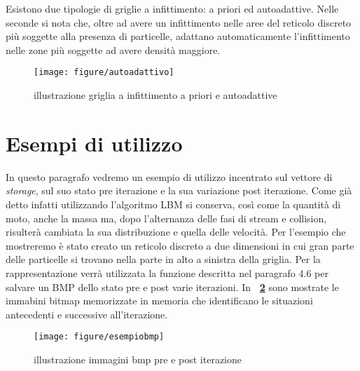 Esistono due tipologie di griglie a infittimento: a priori ed autoadattive. Nelle seconde si nota che, oltre ad avere un infittimento nelle aree del reticolo discreto pi\`u soggette alla presenza di particelle, adattano automaticamente l'infittimento nelle zone pi\`u soggette ad avere densit\`a maggiore.

\begin{figure}[!htb]
	\begin{center}
		\texttt{[image: figure/autoadattivo]}
	\end{center}
	\caption{illustrazione griglia a infittimento a priori e autoadattive\label{fig:autoadattivo}}
\end{figure}\hfill
\section{Esempi di utilizzo}
In questo paragrafo vedremo un esempio di utilizzo incentrato sul vettore di \textit{storage}, sul suo stato pre iterazione e la sua variazione post iterazione. Come gi\`a detto infatti utilizzando l'algoritmo LBM si conserva, cos\`i come la quantit\`a di moto, anche la massa ma, dopo l'alternanza delle fasi di stream e collision, risulter\`a cambiata la sua distribuzione e quella delle velocit\`a. Per l'esempio che mostreremo \`e stato creato un reticolo discreto a due dimensioni in cui gran parte delle particelle si trovano nella parte in alto a sinistra della griglia. Per la rappresentazione verr\`a utilizzata la funzione descritta nel paragrafo 4.6 per salvare un BMP dello stato pre e post varie iterazioni. In \textbf{\figurename~\ref{fig:esempiobmp}} sono mostrate le immabini bitmap memorizzate in memoria che identificano le situazioni antecedenti e successive all'iterazione.

\begin{figure}[!htb]
	\begin{center}
		\texttt{[image: figure/esempiobmp]}
	\end{center}
	\caption{illustrazione immagini bmp pre e post iterazione \label{fig:esempiobmp}}
\end{figure}\hfill